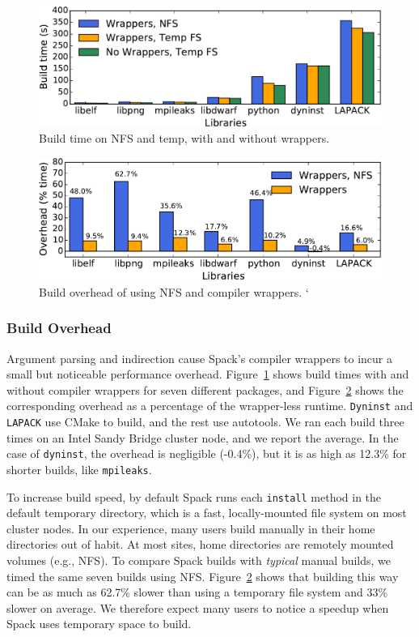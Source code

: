 \begin{figure}%
	\centering
	\includegraphics[width=.95\columnwidth]{figs/overhead/build-time.pdf}
	\caption{
		Build time on NFS and temp, with and without wrappers.
		\label{fig:build-times}
	}
\end{figure}
\begin{figure}%
	\centering
	\includegraphics[width=.95\columnwidth]{figs/overhead/overhead.pdf}
	\caption{
		Build overhead of using NFS and compiler wrappers.
		\label{fig:overhead}`
	}
\end{figure}

\subsubsection{Build Overhead}

Argument parsing and indirection cause Spack's compiler wrappers to incur a small
but noticeable performance overhead.  Figure~\ref{fig:build-times} shows
build times with and without compiler wrappers for seven different packages,
and Figure~\ref{fig:overhead} shows the corresponding overhead as a percentage
of the wrapper-less runtime.  {\tt Dyninst} and {\tt LAPACK} use CMake to 
build, and the rest use autotools.  We ran each build three times on an Intel 
Sandy Bridge cluster node, and we report the average. In the case of 
{\tt dyninst}, the overhead is negligible (-0.4\%), but it is as high 
as 12.3\% for shorter builds, like {\tt mpileaks}.

To increase build speed, by default Spack runs each {\tt install} method 
in the default temporary directory, which is a fast, locally-mounted file 
system on most cluster nodes. In our experience, many users build manually 
in their home directories out of habit.  At most sites, home
directories are remotely mounted volumes (e.g., NFS).  To compare Spack builds
with {\it typical} manual builds, we timed the same seven builds using
NFS.  Figure~\ref{fig:overhead} shows that building this way can be as much
as 62.7\% slower than using a temporary file system and
33\% slower on average. We therefore expect many users to notice
a speedup when Spack uses temporary space to build.


